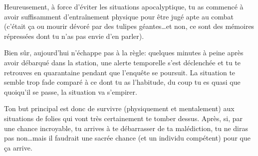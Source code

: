 {	\par Heureusement, à force d'éviter les situations apocalyptique, tu as commencé à avoir suffisamment d'entraînement physique pour être jugé apte au combat (c'était ça ou mourir dévoré par des tulipes géantes\dots et non, ce sont des mémoires répressées dont tu n'as pas envie d'en parler).
	
	\par Bien sûr, aujourd'hui n'échappe pas à la règle: quelques minutes à peine après avoir débarqué dans la station, une alerte temporelle s'est déclenchée et tu te retrouves en quarantaine pendant que l'enquête se poursuit. La situation te semble trop fade comparé à ce dont tu as l'habitude, du coup tu es quasi que quoiqu'il se passe, la situation va s'empirer.
	
	\par Ton but principal est donc de survivre (physiquement et mentalement) aux situations de folies qui vont très certainement te tomber dessus. Après, si, par une chance incroyable, tu arrives à te débarrasser de ta malédiction, tu ne diras pas non\dots mais il faudrait une sacrée chance (et un individu compétent) pour que ça arrive.
}



